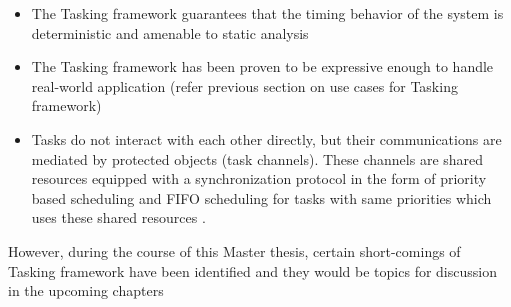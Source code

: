 \begin{itemize}
\item The Tasking framework guarantees that the timing behavior of the system is deterministic and amenable to static analysis
\item The Tasking framework has been proven to be expressive enough to handle real-world application (refer previous section on use cases for Tasking framework)
\item Tasks do not interact with each other directly, but their communications are mediated by protected objects (task channels). These channels are shared resources equipped with a synchronization protocol in the form of priority based scheduling and FIFO scheduling for tasks with same priorities which uses these shared resources \cite{TaskFr}.  
\end{itemize}  

However, during the course of this Master thesis, certain short-comings of Tasking framework have been identified and they would be topics for discussion in the upcoming chapters

             



          